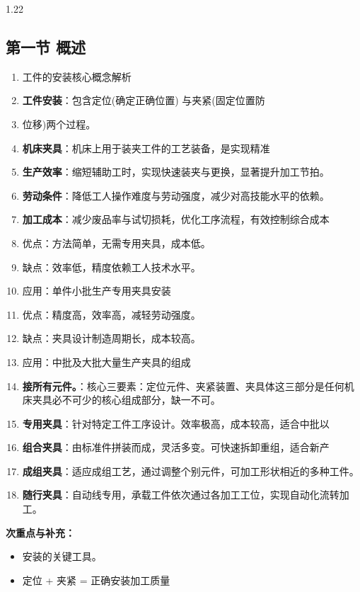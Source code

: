 \documentclass[12pt,a4paper]{article}
\begin{document}
\begin{spacing}{1.22}
\subsection{第一节 概述}
\begin{tcolorbox}[colback=yellow!6,colframe=red!55!black,title=重点,left=1mm,right=1mm]
\begin{enumerate}[leftmargin=2.2em,label=\arabic*.]
  \item 工件的安装核心概念解析
  \item \textbf{工件安装}：包含定位(确定正确位置) 与夹紧(固定位置防
  \item 位移)两个过程。
  \item \textbf{机床夹具}：机床上用于装夹工件的工艺装备，是实现精准
  \item \textbf{生产效率}：缩短辅助工时，实现快速装夹与更换，显著提升加工节拍。
  \item \textbf{劳动条件}：降低工人操作难度与劳动强度，减少对高技能水平的依赖。
  \item \textbf{加工成本}：减少废品率与试切损耗，优化工序流程，有效控制综合成本
  \item 优点：方法简单，无需专用夹具，成本低。
  \item 缺点：效率低，精度依赖工人技术水平。
  \item 应用：单件小批生产专用夹具安装
  \item 优点：精度高，效率高，减轻劳动强度。
  \item 缺点：夹具设计制造周期长，成本较高。
  \item 应用：中批及大批大量生产夹具的组成
  \item \textbf{接所有元件。}：核心三要素：定位元件、夹紧装置、夹具体这三部分是任何机床夹具必不可少的核心组成部分，缺一不可。
  \item \textbf{专用夹具}：针对特定工件工序设计。效率极高，成本较高，适合中批以
  \item \textbf{组合夹具}：由标准件拼装而成，灵活多变。可快速拆卸重组，适合新产
  \item \textbf{成组夹具}：适应成组工艺，通过调整个别元件，可加工形状相近的多种工件。
  \item \textbf{随行夹具}：自动线专用，承载工件依次通过各加工工位，实现自动化流转加工。
\end{enumerate}
\end{tcolorbox}
\noindent\textbf{次重点与补充：}
\begin{itemize}[leftmargin=2.2em,label=--]
  \item 安装的关键工具。
  \item 定位 + 夹紧 = 正确安装加工质量

\end{itemize}
\end{spacing}
\end{document}
